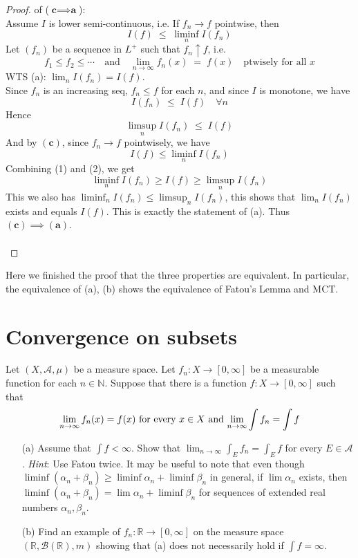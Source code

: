 \documentclass[lang=cn,11pt]{elegantbook}
\begin{document}
\begin{proof}
of (\(\textbf{c} \implies \textbf{a}\)): \\
Assume $I$ is lower semi-continuous, i.e.  If \(f_n \to f\) pointwise, then \[
    I(f) \;\le\; \liminf_{n} I(f_n)
  \] Let \((f_n)\) be a sequence in \(L^+\) such that \(f_n \uparrow f\), i.e. \[
  f_1 \le f_2 \le \cdots
  \quad\text{and}\quad
  \lim_{n\to\infty} f_n(x) \;=\; f(x) \quad\text{ptwisely for all }x
\]
WTS (a): \(\lim_{n} I(f_n) = I(f)\). \\

Since $f_n$ is an increasing seq, \(f_n \le f\) for each $n$, and since \(I\) is monotone, we have \[
     I(f_n) \;\le\; I(f)
     \quad \forall n
   \]
Hence \[\limsup_{n} I(f_n) \;\le\;I(f) \]
And by \(\mathbf{(c)}\), since \(f_n \to f\) pointwisely, we have \[I(f) \le \liminf_{n} I(f_n)\]
Combining (1) and (2), we get
\[
  \liminf_{n} I(f_n)
  \ge I(f) \ge
  \limsup_{n} I(f_n)
\]
This we also has $ \liminf_{n} I(f_n) \leq 
  \limsup_{n} I(f_n)$, this shows that \(\lim_{n} I(f_n)\) exists and equals \(I(f)\).  This is exactly the statement of (a). Thus \(\mathbf{(c)} \implies \mathbf{(a)}\).\\\\
\end{proof}
Here we finished the proof that the three properties are equivalent. In particular, the equivalence of (a), (b) shows the equivalence of Fatou's Lemma and MCT.



\section{Convergence on subsets}
  Let $(X, \mathcal{A}, \mu)$ be a measure space. Let $f_n\colon X\to [0, \infty]$ be a measurable function for each $n\in \mathbb{N}$. 
Suppose that there is a function $f\colon X\to [0, \infty]$ such that 
\[
  \text{$\lim_{n\to \infty} f_n(x) = f(x)$ for every $x\in X$ and 
    $ \lim_{n\to \infty} \int f_n  = \int f$}
\]
\begin{itemize}
\item[(a)] Assume that $ \int f<\infty$. Show that $ \lim_{n\to \infty} \int_E f_n =\int_E f$ for every $E\in \mathcal{A}$. 
\textit{Hint}: Use Fatou twice. %
It may be useful to note that even though $\liminf (\alpha_n+\beta_n)\ge \liminf \alpha_n + \liminf \beta_n$ in general, if $\lim \alpha_n$ exists, then $\liminf (\alpha_n+\beta_n)=  \lim \alpha_n + \liminf \beta_n$ for sequences of extended real numbers $\alpha_n, \beta_n$.
\item[(b)]Find an example of $f_n\colon \mathbb{R}\to [0, \infty]$ on the measure space $(\mathbb{R}, \mathcal{B}(\mathbb{R}), m)$ showing that (a) does not necessarily hold if $ \int f=\infty$.
\end{itemize}
\end{document}
